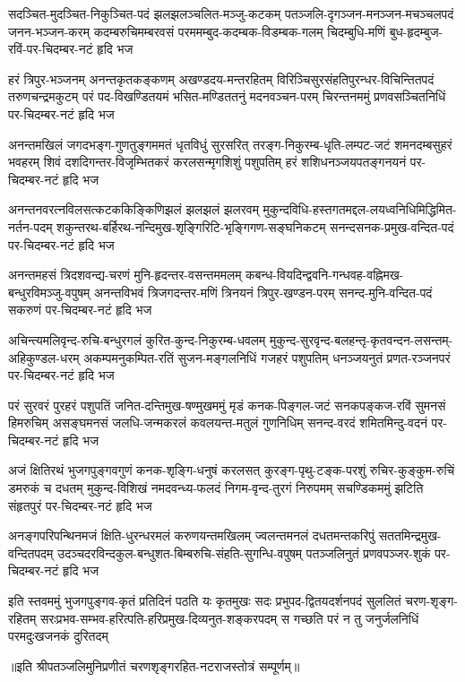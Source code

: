 \setlength{\shlokaspaceskip}{4pt}
\fourlineindentedshloka
{सदञ्चित-मुदञ्चित-निकुञ्चित-पदं झलझलञ्चलित-मञ्जु-कटकम्}
{पतञ्जलि-दृगञ्जन-मनञ्जन-मचञ्चलपदं जनन-भञ्जन-करम्}
{कदम्बरुचिमम्बरवसं परममम्बुद-कदम्बक-विडम्बक-गलम्}
{चिदम्बुधि-मणिं बुध-हृदम्बुज-रविं-पर-चिदम्बर-नटं हृदि भज} %

\fourlineindentedshloka
{हरं त्रिपुर-भञ्जनम् अनन्तकृतकङ्कणम् अखण्डदय-मन्तरहितम्}
{विरिञ्चिसुरसंहतिपुरन्धर-विचिन्तितपदं तरुणचन्द्रमकुटम्}
{परं पद-विखण्डितयमं भसित-मण्डिततनुं मदनवञ्चन-परम्}
{चिरन्तनममुं प्रणवसञ्चितनिधिं पर-चिदम्बर-नटं हृदि भज} %

\fourlineindentedshloka
{अनन्तमखिलं जगदभङ्ग-गुणतुङ्गममतं धृतविधुं सुरसरित्}
{तरङ्ग-निकुरम्ब-धृति-लम्पट-जटं शमनदम्बसुहरं भवहरम्}
{शिवं दशदिगन्तर-विजृम्भितकरं करलसन्मृगशिशुं पशुपतिम्}
{हरं शशिधनञ्जयपतङ्गनयनं पर-चिदम्बर-नटं हृदि भज} %

\fourlineindentedshloka
{अनन्तनवरत्नविलसत्कटककिङ्किणिझलं झलझलं झलरवम्}
{मुकुन्दविधि-हस्तगतमद्दल-लयध्वनिधिमिद्धिमित-नर्तन-पदम्}
{शकुन्तरथ-बर्हिरथ-नन्दिमुख-शृङ्गिरिटि-भृङ्गिगण-सङ्घनिकटम्}
{सनन्दसनक-प्रमुख-वन्दित-पदं पर-चिदम्बर-नटं हृदि भज} %

\fourlineindentedshloka
{अनन्तमहसं त्रिदशवन्द्य-चरणं मुनि-हृदन्तर-वसन्तममलम्}
{कबन्ध-वियदिन्द्ववनि-गन्धवह-वह्निमख-बन्धुरविमञ्जु-वपुषम्}
{अनन्तविभवं त्रिजगदन्तर-मणिं त्रिनयनं त्रिपुर-खण्डन-परम्}
{सनन्द-मुनि-वन्दित-पदं सकरुणं पर-चिदम्बर-नटं हृदि भज} %

\fourlineindentedshloka
{अचिन्त्यमलिवृन्द-रुचि-बन्धुरगलं कुरित-कुन्द-निकुरम्ब-धवलम्}
{मुकुन्द-सुरवृन्द-बलहन्तृ-कृतवन्दन-लसन्तम्-अहिकुण्डल-धरम्}
{अकम्पमनुकम्पित-रतिं सुजन-मङ्गलनिधिं गजहरं पशुपतिम्}
{धनञ्जयनुतं प्रणत-रञ्जनपरं पर-चिदम्बर-नटं हृदि भज} %

\fourlineindentedshloka
{परं सुरवरं पुरहरं पशुपतिं जनित-दन्तिमुख-षण्मुखममुं}
{मृडं कनक-पिङ्गल-जटं सनकपङ्कज-रविं सुमनसं हिमरुचिम्}
{असङ्घमनसं जलधि-जन्मकरलं कवलयन्त-मतुलं गुणनिधिम्}
{सनन्द-वरदं शमितमिन्दु-वदनं पर-चिदम्बर-नटं हृदि भज} %

\fourlineindentedshloka
{अजं क्षितिरथं भुजगपुङ्गवगुणं कनक-शृङ्गि-धनुषं करलसत्}
{कुरङ्ग-पृथु-टङ्क-परशुं रुचिर-कुङ्कुम-रुचिं डमरुकं च दधतम्}
{मुकुन्द-विशिखं नमदवन्ध्य-फलदं निगम-वृन्द-तुरगं निरुपमम्}
{सचण्डिकममुं झटिति संहृतपुरं पर-चिदम्बर-नटं हृदि भज} %

\fourlineindentedshloka
{अनङ्गपरिपन्थिनमजं क्षिति-धुरन्धरमलं करुणयन्तमखिलम्}
{ज्वलन्तमनलं दधतमन्तकरिपुं सततमिन्द्रमुख-वन्दितपदम्}
{उदञ्चदरविन्दकुल-बन्धुशत-बिम्बरुचि-संहति-सुगन्धि-वपुषम्}
{पतञ्जलिनुतं प्रणवपञ्जर-शुकं पर-चिदम्बर-नटं हृदि भज} %

\fourlineindentedshloka
{इति स्तवममुं भुजगपुङ्गव-कृतं प्रतिदिनं पठति यः कृतमुखः}
{सदः प्रभुपद-द्वितयदर्शनपदं सुललितं चरण-शृङ्ग-रहितम्}
{सरःप्रभव-सम्भव-हरित्पति-हरिप्रमुख-दिव्यनुत-शङ्करपदम्}
{स गच्छति परं न तु जनुर्जलनिधिं परमदुःखजनकं दुरितदम्} %

॥इति श्रीपतञ्जलिमुनिप्रणीतं चरणशृङ्गरहित-नटराजस्तोत्रं सम्पूर्णम्॥
\setlength{\shlokaspaceskip}{24pt}